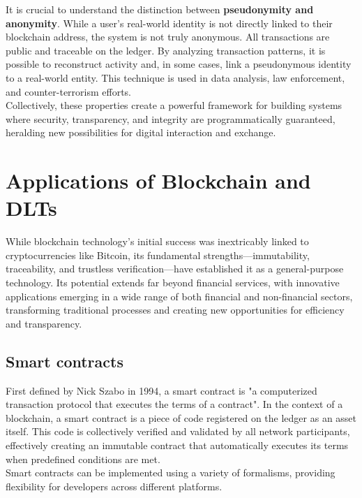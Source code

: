 \documentclass{scrbook}
\begin{document}
It is crucial to understand the distinction between \textbf{pseudonymity and anonymity}. While a user's real-world identity is not directly linked to their blockchain address, the system is not truly anonymous. All transactions are public and traceable on the ledger. By analyzing transaction patterns, it is possible to reconstruct activity and, in some cases, link a pseudonymous identity to a real-world entity. This technique is used in data analysis, law enforcement, and counter-terrorism efforts. \\

Collectively, these properties create a powerful framework for building systems where security, transparency, and integrity are programmatically guaranteed, heralding new possibilities for digital interaction and exchange.

\chapter{Applications of Blockchain and DLTs}

While blockchain technology's initial success was inextricably linked to cryptocurrencies like Bitcoin, its fundamental strengths—immutability, traceability, and trustless verification—have established it as a general-purpose technology. Its potential extends far beyond financial services, with innovative applications emerging in a wide range of both financial and non-financial sectors, transforming traditional processes and creating new opportunities for efficiency and transparency.

\section{Smart contracts}

First defined by Nick Szabo in 1994, a smart contract is "a computerized transaction protocol that executes the terms of a contract". In the context of a blockchain, a smart contract is a piece of code registered on the ledger as an asset itself. This code is collectively verified and validated by all network participants, effectively creating an immutable contract that automatically executes its terms when predefined conditions are met. \\

Smart contracts can be implemented using a variety of formalisms, providing flexibility for developers across different platforms.
\end{document}
